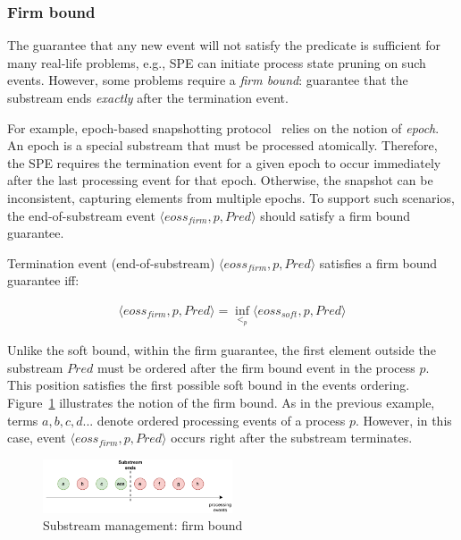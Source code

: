 \subsubsection{Firm bound}

The guarantee that any new event will not satisfy the predicate is sufficient for many real-life problems, e.g., SPE can initiate process state pruning on such events. However, some problems require a {\em firm bound}: guarantee that the substream ends {\em exactly} after the termination event. 

For example, epoch-based snapshotting protocol~\cite{2015arXiv150608603C, jacques2016consistent} relies on the notion of {\em epoch}. An epoch is a special substream that must be processed atomically. Therefore, the SPE requires the termination event for a given epoch to occur immediately after the last processing event for that epoch. Otherwise, the snapshot can be inconsistent, capturing elements from multiple epochs. To support such scenarios, the end-of-substream event $\langle eoss_{firm}, p, Pred\rangle$ should satisfy a firm bound guarantee.

\begin{definition}
Termination event (end-of-substream) $\langle eoss_{firm}, p, Pred\rangle$ satisfies a firm bound guarantee iff:

\begin{multline}
\langle eoss_{firm}, p, Pred\rangle = \inf_{<_p} \langle eoss_{soft}, p, Pred\rangle
\end{multline}
\end{definition}

Unlike the soft bound, within the firm guarantee, the first element outside the substream $Pred$ must be ordered after the firm bound event in the process $p$. This position satisfies the first possible soft bound in the events ordering. Figure~\ref{strict_guarantees} illustrates the notion of the firm bound. As in the previous example, terms $a,b,c,d...$ denote ordered processing events of a process $p$. However, in this case, event $\langle eoss_{firm}, p, Pred\rangle$ occurs right after the substream terminates.

\begin{figure}[t]
  \centering
  \includegraphics[width=0.50\textwidth]{pics/strict-guarantee.pdf}
  \caption{Substream management: firm bound}
  \label{strict_guarantees}
\end{figure}


